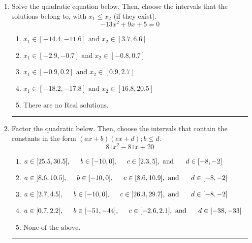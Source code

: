 \documentclass[14pt]{extbook}
\newcommand{\litem}[1]{\item#1\hspace*{-1cm}\rule{\textwidth}{0.4pt}}
\begin{document}
\begin{enumerate}
{\begin{enumerate}[label=\Alph*.]
\end{enumerate} }
\litem{
Solve the quadratic equation below. Then, choose the intervals that the solutions belong to, with $x_1 \leq x_2$ (if they exist).\[ -13x^{2} +9 x + 5 = 0 \]\begin{enumerate}[label=\Alph*.]
\item \( x_1 \in [-14.4, -11.6] \text{ and } x_2 \in [3.7, 6.6] \)
\item \( x_1 \in [-2.9, -0.7] \text{ and } x_2 \in [-0.8, 0.7] \)
\item \( x_1 \in [-0.9, 0.2] \text{ and } x_2 \in [0.9, 2.7] \)
\item \( x_1 \in [-18.2, -17.8] \text{ and } x_2 \in [16.8, 20.5] \)
\item \( \text{There are no Real solutions.} \)

\end{enumerate} }
\litem{
Factor the quadratic below. Then, choose the intervals that contain the constants in the form $(ax+b)(cx+d); b \leq d.$\[ 81x^{2} -81 x + 20 \]\begin{enumerate}[label=\Alph*.]
\item \( a \in [25.5, 30.5], \hspace*{5mm} b \in [-10, 0], \hspace*{5mm} c \in [2.3, 5], \text{ and } \hspace*{5mm} d \in [-8, -2] \)
\item \( a \in [8.6, 10.5], \hspace*{5mm} b \in [-10, 0], \hspace*{5mm} c \in [8.6, 10.9], \text{ and } \hspace*{5mm} d \in [-8, -2] \)
\item \( a \in [2.7, 4.5], \hspace*{5mm} b \in [-10, 0], \hspace*{5mm} c \in [26.3, 29.7], \text{ and } \hspace*{5mm} d \in [-8, -2] \)
\item \( a \in [0.7, 2.2], \hspace*{5mm} b \in [-51, -44], \hspace*{5mm} c \in [-2.6, 2.1], \text{ and } \hspace*{5mm} d \in [-38, -33] \)
\item \( \text{None of the above.} \)


\end{enumerate}}
\end{enumerate}
\end{document}
